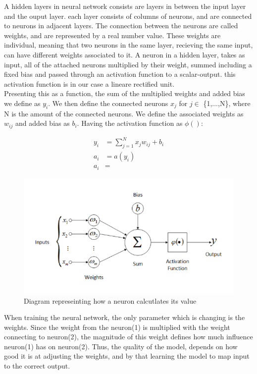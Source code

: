 
A hidden layers in neural network consists are layers in between the input layer and the ouput layer. each layer consists of columns of neurons, and are connected to neurons in adjacent layers. The connection between the neurons are called weights, and are represented by a real number value. These weights are individual, meaning that two neurons in the same layer, recieving the same input, can have different weights associated to it. A neuron in a hidden layer, takes as input, all of the attached neurons multiplied by their weight, summed including a fixed bias and passed through an activation function to a scalar-output. this activation function is in our case a lineare rectified unit.\\

\noindent
Presenting this as a function, the sum of the multiplied weights and added bias we define as $y_i$. We then define the connected neurons $x_j$ for $j \in$ \{1,...,N\}, where N is the amount of the connected neurons. We define the associated weights as $w_{ij}$ and added bias as $b_i$. Having the activation function as $\phi()$:

\begin{align}
	y_i &= \sum^N_{j=1} x_jw_{ij} + b_i\\
	a_i &= a(y_i) \\
	a_i &=
\end{align}


\begin{figure}[!ht]
  \centering
  \includegraphics[scale=1.0]{latex/IMGs/neuronFunc.png}
  \caption{Diagram represeinting how a neuron calcutlates its value}\label{Baseline:before}
\end{figure}

\noindent
When training the neural network, the only parameter which is changing is the weights. Since the weight from the neuron(1) is multiplied with the weight connecting to neuron(2), the magnitude of this weight defines how much influence neuron(1) has on neuron(2). Thus, the quality of the model, depends on how good it is at adjusting the weights, and by that learning the model to map input to the correct output.
